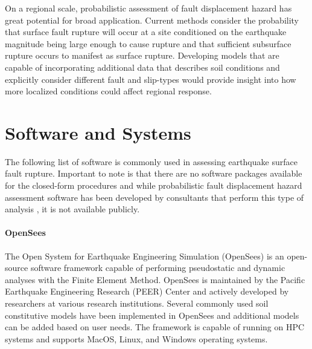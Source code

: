 On a regional scale, probabilistic assessment of fault displacement hazard has great potential for broad application. Current methods consider the probability that surface fault rupture will occur at a site conditioned on the earthquake magnitude being large enough to cause rupture and that sufficient subsurface rupture occurs to manifest as surface rupture. Developing models that are capable of incorporating additional data that describes soil conditions and explicitly consider different fault and slip-types would provide insight into how more localized conditions could affect regional response.


\section{Software and Systems}
\label{sec:eq_surface_rup_tools}

The following list of software is commonly used in assessing earthquake surface fault rupture. Important to note is that there are no software packages available for the closed-form procedures and while probabilistic fault displacement hazard assessment software has been developed by consultants that perform this type of analysis \citep{wells2014probabilistic}, it is not available publicly.

\paragraph{OpenSees}
The Open System for Earthquake Engineering Simulation (OpenSees) is an open-source software framework capable of performing pseudostatic and dynamic analyses with the Finite Element Method. OpenSees is maintained by the Pacific Earthquake Engineering Research (PEER) Center and actively developed by researchers at various research institutions. Several commonly used soil constitutive models have been implemented in OpenSees and additional models can be added based on user needs. The framework is capable of running on HPC systems and supports MacOS, Linux, and Windows operating systems.

